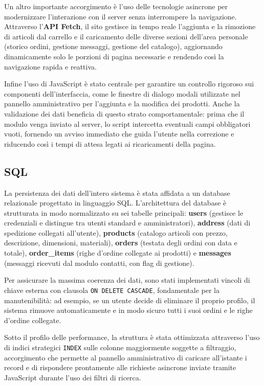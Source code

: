 \documentclass[11pt,a4paper]{article}
\begin{document}
Un altro importante accorgimento \`e l'uso delle tecnologie asincrone per modernizzare l'interazione con il server senza interrompere la navigazione. Attraverso l'\textbf{API Fetch}, il sito gestisce in tempo reale l'aggiunta e la rimozione di articoli dal carrello e il caricamento delle diverse sezioni dell'area personale (storico ordini, gestione messaggi, gestione del catalogo), aggiornando dinamicamente solo le porzioni di pagina necessarie e rendendo cos\`i la navigazione rapida e reattiva.

Infine l'uso di JavaScript \`e stato centrale per garantire un controllo rigoroso sui componenti dell'interfaccia, come le finestre di dialogo modali utilizzate nel pannello amministrativo per l'aggiunta e la modifica dei prodotti. Anche la validazione dei dati beneficia di questo strato comportamentale: prima che il modulo venga inviato al server, lo script intercetta eventuali campi obbligatori vuoti, fornendo un avviso immediato che guida l'utente nella correzione e riducendo cos\`i i tempi di attesa legati ai ricaricamenti della pagina.

\subsection{SQL}
La persistenza dei dati dell'intero sistema \`e stata affidata a un database relazionale progettato in linguaggio SQL. L'architettura del database \`e strutturata in modo normalizzato su sei tabelle principali: \textbf{users} (gestisce le credenziali e distingue tra utenti standard e amministratori), \textbf{address} (dati di spedizione collegati all'utente), \textbf{products} (catalogo articoli con prezzo, descrizione, dimensioni, materiali), \textbf{orders} (testata degli ordini con data e totale), \textbf{order\_items} (righe d'ordine collegate ai prodotti) e \textbf{messages} (messaggi ricevuti dal modulo contatti, con flag di gestione).

Per assicurare la massima coerenza dei dati, sono stati implementati vincoli di chiave esterna con clausola \texttt{ON DELETE CASCADE}, fondamentale per la manutenibilit\`a: ad esempio, se un utente decide di eliminare il proprio profilo, il sistema rimuove automaticamente e in modo sicuro tutti i suoi ordini e le righe d'ordine collegate.

Sotto il profilo delle performance, la struttura \`e stata ottimizzata attraverso l'uso di indici strategici \texttt{INDEX} sulle colonne maggiormente soggette a filtraggio, accorgimento che permette al pannello amministrativo di caricare all'istante i record e di rispondere prontamente alle richieste asincrone inviate tramite JavaScript durante l'uso dei filtri di ricerca.
\end{document}

